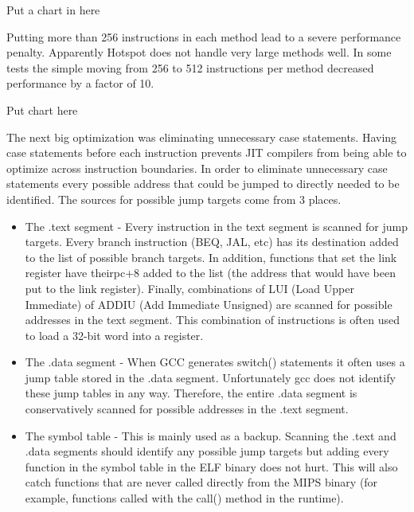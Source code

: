 \documentclass{acmconf}
\begin{document}
Put a chart in here

Putting more than 256 instructions in each method lead to a severe
performance penalty. Apparently Hotspot does not handle very large methods
well. In some tests the simple moving from 256 to 512 instructions per
method decreased performance by a factor of 10.

Put chart here

The next big optimization was eliminating unnecessary case
statements. Having case statements before each instruction prevents
JIT compilers from being able to optimize across instruction
boundaries. In order to eliminate unnecessary case statements every
possible address that could be jumped to directly needed to be
identified. The sources for possible jump targets come from 3 places.

\begin{itemize}

\item The .text segment - Every instruction in the text segment is
      scanned for jump targets. Every branch instruction (BEQ, JAL,
      etc) has its destination added to the list of possible branch
      targets. In addition, functions that set the link register have
      theirpc+8 added to the list (the address that would have been put
      to the link register). Finally, combinations of LUI (Load Upper
      Immediate) of ADDIU (Add Immediate Unsigned) are scanned for
      possible addresses in the text segment. This combination of
      instructions is often used to load a 32-bit word into a
      register.

\item The .data segment - When GCC generates switch() statements it
      often uses a jump table stored in the .data
      segment. Unfortunately gcc does not identify these jump tables in
      any way. Therefore, the entire .data segment is conservatively
      scanned for possible addresses in the .text segment.
      
\item The symbol table - This is mainly used as a backup. Scanning the
      .text and .data segments should identify any possible jump
      targets but adding every function in the symbol table in the ELF
      binary does not hurt. This will also catch functions that are
      never called directly from the MIPS binary (for example,
      functions called with the call() method in the runtime).

\end{itemize}
\end{document}
